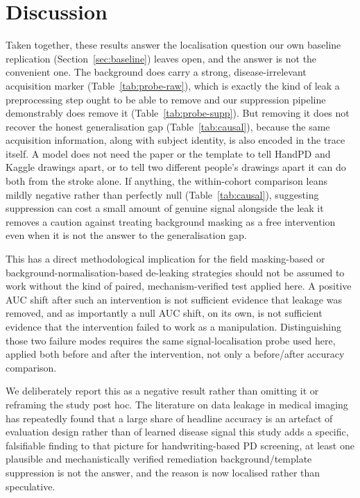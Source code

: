 \documentclass[3p,final,10pt]{elsarticle}
\let\oldsection\section
\renewcommand{\section}{\FloatBarrier\oldsection}
\begin{document}
\section{Discussion}
\label{sec:discussion}

Taken together, these results answer the localisation question our own
baseline replication (Section~\ref{sec:baseline}) leaves open, and the
answer is not the convenient one. The
background does carry a strong, disease-irrelevant acquisition marker
(Table~\ref{tab:probe-raw}), which is exactly the kind of leak a
preprocessing step ought to be able to remove and our suppression
pipeline demonstrably does remove it (Table~\ref{tab:probe-supp}). But
removing it does not recover the honest generalisation gap
(Table~\ref{tab:causal}), because the same acquisition information, along
with subject identity, is also encoded in the trace itself. A model does
not need the paper or the template to tell HandPD and Kaggle drawings
apart, or to tell two different people's drawings apart it can do both
from the stroke alone. If anything, the within-cohort comparison leans
mildly negative rather than perfectly null (Table~\ref{tab:causal}),
suggesting suppression can cost a small amount of genuine signal alongside
the leak it removes a
caution against treating background masking as a free intervention even
when it is not the answer to the generalisation gap.

This has a direct methodological implication for the field masking-based
or background-normalisation-based de-leaking strategies should not be
assumed to work without the kind of paired, mechanism-verified test applied
here. A positive AUC shift after such an intervention is not sufficient
evidence that leakage was removed, and as importantly a null AUC
shift, on its own, is not sufficient evidence that the intervention failed
to work as a manipulation. Distinguishing those two failure modes requires
the same signal-localisation probe used here, applied both before and
after the intervention, not only a before/after accuracy comparison.

We deliberately report this as a negative result rather than omitting it
or reframing the study post hoc. The literature on data leakage in medical
imaging has repeatedly found that a large share of headline accuracy is an
artefact of evaluation design rather than of learned disease signal
\cite{tampu2022} this study adds a specific, falsifiable finding to that
picture for handwriting-based PD screening, at least one plausible and
mechanistically verified remediation background/template suppression
is not the answer, and the reason is now localised rather than speculative.
\end{document}
